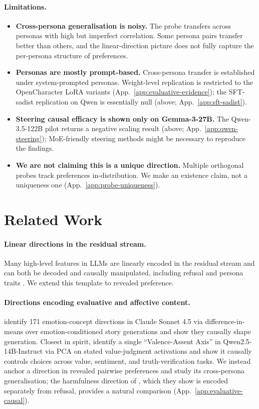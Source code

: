 \documentclass{article}
\begin{document}
\paragraph{Limitations.}
\begin{itemize}
\item \textbf{Cross-persona generalisation is noisy.} The probe transfers across personas with high but imperfect correlation. Some persona pairs transfer better than others, and the linear-direction picture does not fully capture the per-persona structure of preferences.
\item \textbf{Personas are mostly prompt-based.} Cross-persona transfer is established under system-prompted personas. Weight-level replication is restricted to the OpenCharacter LoRA variants (App.~\ref{app:evaluative-evidence}); the SFT-sadist replication on Qwen is essentially null (above; App.~\ref{app:sft-sadist}).
\item \textbf{Steering causal efficacy is shown only on Gemma-3-27B.} The Qwen-3.5-122B pilot returns a negative scaling result (above; App.~\ref{app:qwen-steering}); MoE-friendly steering methods might be necessary to reproduce the findings.
\item \textbf{We are not claiming this is a unique direction.} Multiple orthogonal probes track preferences in-distribution. We make an existence claim, not a uniqueness one (App.~\ref{app:probe-uniqueness}).
\end{itemize}

\section{Related Work}
\label{sec:related}

\paragraph{Linear directions in the residual stream.} Many high-level features in LLMs are linearly encoded in the residual stream and can both be decoded and causally manipulated, including refusal \citep{arditi2024refusal} and persona traits \citep{chen2025personavectors}. We extend this template to revealed preference.

\paragraph{Directions encoding evaluative and affective content.} \citet{anthropic2026emotions} identify 171 emotion-concept directions in Claude Sonnet 4.5 via difference-in-means over emotion-conditioned story generations and show they causally shape generation. Closest in spirit, \citet{lu2025judgmentaxis} identify a single ``Valence-Assent Axis'' in Qwen2.5-14B-Instruct via PCA on stated value-judgment activations and show it causally controls choices across value, sentiment, and truth-verification tasks. We instead anchor a direction in revealed pairwise preferences and study its cross-persona generalisation; the harmfulness direction of \citet{zhao2025harmfulnessrefusal}, which they show is encoded separately from refusal, provides a natural comparison (App.~\ref{app:evaluative-causal}).
\end{document}
